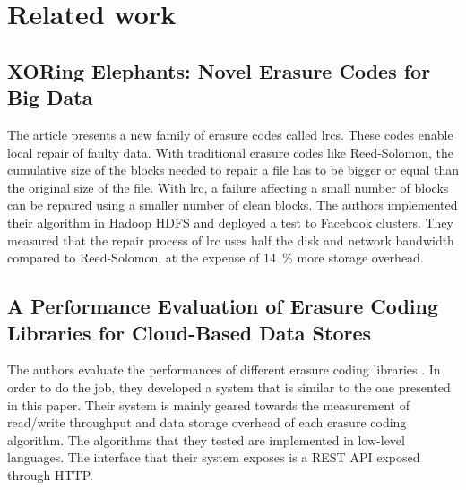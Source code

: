 \section{Related work}

\subsection{XORing Elephants: Novel Erasure Codes for Big Data}

The article \autocite{XorbasVLDB} presents a new family of erasure codes called \acp{lrc}.
These codes enable local repair of faulty data.
With traditional erasure codes like Reed-Solomon, the cumulative size of the blocks needed to repair a file has to be bigger or equal than the original size of the file.
With \ac{lrc}, a failure affecting a small number of blocks can be repaired using a smaller number of clean blocks.
The authors implemented their algorithm in Hadoop HDFS and deployed a test to Facebook clusters.
They measured that the repair process of \ac{lrc} uses half the disk and network bandwidth compared to Reed-Solomon, at the expense of \SI{14}{\percent} more storage overhead.

\subsection{A Performance Evaluation of Erasure Coding Libraries for Cloud-Based Data Stores}

The authors evaluate the performances of different erasure coding libraries \autocite{Burihabwa2016}.
In order to do the job, they developed a system that is similar to the one presented in this paper.
Their system is mainly geared towards the measurement of read/write throughput and data storage overhead of each erasure coding algorithm.
The algorithms that they tested are implemented in low-level languages.
The interface that their system exposes is a REST API exposed through HTTP.
